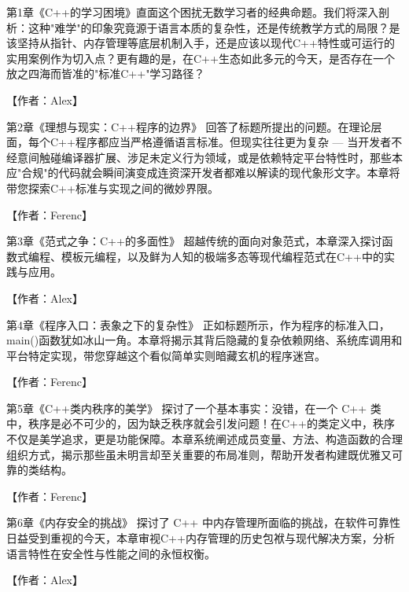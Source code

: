 
第1章《C++的学习困境》直面这个困扰无数学习者的经典命题。我们将深入剖析：这种"难学"的印象究竟源于语言本质的复杂性，还是传统教学方式的局限？是该坚持从指针、内存管理等底层机制入手，还是应该以现代C++特性或可运行的实用案例作为切入点？更有趣的是，在C++生态如此多元的今天，是否存在一个放之四海而皆准的"标准C++"学习路径？

【作者：Alex】

\hspace*{\fill}

第2章《理想与现实：C++程序的边界》 回答了标题所提出的问题。在理论层面，每个C++程序都应当严格遵循语言标准。但现实往往更为复杂 --- 当开发者不经意间触碰编译器扩展、涉足未定义行为领域，或是依赖特定平台特性时，那些本应"合规"的代码就会瞬间演变成连资深开发者都难以解读的现代象形文字。本章将带您探索C++标准与实现之间的微妙界限。

【作者：Ferenc】

\hspace*{\fill}

第3章《范式之争：C++的多面性》 超越传统的面向对象范式，本章深入探讨函数式编程、模板元编程，以及鲜为人知的极端多态等现代编程范式在C++中的实践与应用。

【作者：Alex】

\hspace*{\fill}

第4章《程序入口：表象之下的复杂性》 正如标题所示，作为程序的标准入口，main()函数犹如冰山一角。本章将揭示其背后隐藏的复杂依赖网络、系统库调用和平台特定实现，带您穿越这个看似简单实则暗藏玄机的程序迷宫。

【作者：Ferenc】

\hspace*{\fill}

第5章《C++类内秩序的美学》 探讨了一个基本事实：没错，在一个 C++ 类中，秩序是必不可少的，因为缺乏秩序就会引发问题！在C++的类定义中，秩序不仅是美学追求，更是功能保障。本章系统阐述成员变量、方法、构造函数的合理组织方式，揭示那些虽未明言却至关重要的布局准则，帮助开发者构建既优雅又可靠的类结构。

【作者：Ferenc】

\hspace*{\fill}

第6章《内存安全的挑战》 探讨了 C++ 中内存管理所面临的挑战，在软件可靠性日益受到重视的今天，本章审视C++内存管理的历史包袱与现代解决方案，分析语言特性在安全性与性能之间的永恒权衡。

【作者：Alex】

